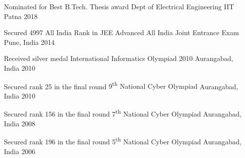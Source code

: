 
\begin{cvhonors}

\cvhonor
	{Nominated for Best B.Tech. Thesis award} %
	{Dept of Electrical Engineering} %
	{IIT Patna} %
	{2018} %

\cvhonor
	{Secured 4997 All India Rank in JEE Advanced} %
	{All India Joint Entrance Exam} %
	{Pune, India} %
	{2014} %

\cvhonor
	{Received silver medal} %
	{International Informatics Olympiad 2010} %
	{Aurangabad, India} %
	{2010} %

\cvhonor
	{Secured rank 25 in the final round} %
	{9\textsuperscript{th} National Cyber Olympiad} %
	{Aurangabad, India} %
	{2010} %

\cvhonor
	{Secured rank 156 in the final round} %
	{7\textsuperscript{th} National Cyber Olympiad} %
	{Aurangabad, India} %
	{2008} %

\cvhonor
	{Secured rank 196 in the final round} %
	{5\textsuperscript{th} National Cyber Olympiad} %
	{Aurangabad, India} %
	{2006} %

\end{cvhonors}
